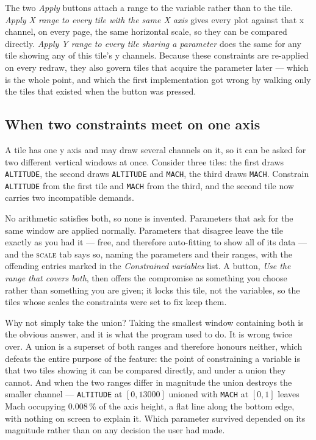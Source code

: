 \documentclass[11pt,a4paper,oneside]{report}
\newcommand{\code}[1]{\texttt{#1}}
\newcommand{\tab}[1]{\textsc{#1}}
\begin{document}
The two \emph{Apply} buttons attach a range to the variable rather than to the
tile. \emph{Apply X range to every tile with the same X axis} gives every plot
against that x channel, on every page, the same horizontal scale, so they can be
compared directly. \emph{Apply Y range to every tile sharing a parameter} does
the same for any tile showing any of this tile's y channels. Because these
constraints are re-applied on every redraw, they also govern tiles that acquire
the parameter later --- which is the whole point, and which the first
implementation got wrong by walking only the tiles that existed when the button
was pressed.

\subsection{When two constraints meet on one axis}

A tile has one y axis and may draw several channels on it, so it can be asked for
two different vertical windows at once. Consider three tiles: the first draws
\code{ALTITUDE}, the second draws \code{ALTITUDE} and \code{MACH}, the third
draws \code{MACH}. Constrain \code{ALTITUDE} from the first tile and \code{MACH}
from the third, and the second tile now carries two incompatible demands.

No arithmetic satisfies both, so none is invented. Parameters that ask for the
same window are applied normally. Parameters that disagree leave the tile exactly
as you had it --- free, and therefore auto-fitting to show all of its data ---
and the \tab{scale} tab says so, naming the parameters and their ranges, with the
offending entries marked in the \emph{Constrained variables} list. A button,
\emph{Use the range that covers both}, then offers the compromise as something
you choose rather than something you are given; it locks this tile, not the
variables, so the tiles whose scales the constraints were set to fix keep them.

\begin{aoenote}{Why not simply take the union?}
Taking the smallest window containing both is the obvious answer, and it is what
the program used to do. It is wrong twice over. A union is a superset of both
ranges and therefore honours neither, which defeats the entire purpose of the
feature: the point of constraining a variable is that two tiles showing it can be
compared directly, and under a union they cannot. And when the two ranges differ
in magnitude the union destroys the smaller channel --- \code{ALTITUDE} at
$[0, 13000]$ unioned with \code{MACH} at $[0, 1]$ leaves Mach occupying
0.008\,\% of the axis height, a flat line along the bottom edge, with nothing on
screen to explain it. Which parameter survived depended on its magnitude rather
than on any decision the user had made.
\end{aoenote}
\end{document}

